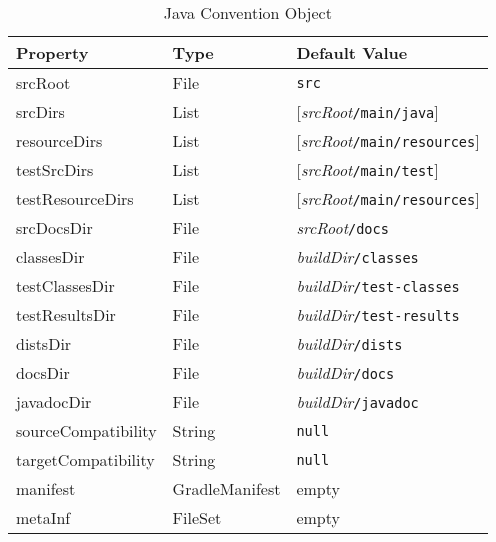 \begin{table}[h]
	\begin{center}
		\begin{tabular}{|l|l|l|} \hline
			\textbf{Property} & \textbf{Type} & \textbf{Default Value} \\ \hline
			srcRoot & File & \texttt{src} \\ \hline
			srcDirs & List & [\emph{srcRoot}\texttt{/main/java}] \\ \hline
			resourceDirs & List & [\emph{srcRoot}\texttt{/main/resources}]\\ \hline
			testSrcDirs & List & [\emph{srcRoot}\texttt{/main/test}] \\ \hline
			testResourceDirs & List & [\emph{srcRoot}\texttt{/main/resources}] \\ \hline
			srcDocsDir & File & \emph{srcRoot}\texttt{/docs} \\ \hline
			classesDir & File & \emph{buildDir}\texttt{/classes} \\ \hline
			testClassesDir & File & \emph{buildDir}\texttt{/test-classes} \\ \hline
			testResultsDir & File & \emph{buildDir}\texttt{/test-results} \\ \hline
			distsDir & File & \emph{buildDir}\texttt{/dists} \\ \hline
			docsDir & File & \emph{buildDir}\texttt{/docs} \\ \hline
			javadocDir & File & \emph{buildDir}\texttt{/javadoc} \\ \hline
			sourceCompatibility & String & \texttt{null} \\ \hline
			targetCompatibility & String & \texttt{null} \\ \hline
			manifest & GradleManifest & empty \\ \hline
			metaInf & FileSet & empty \\ \hline
		\end{tabular}
	\end{center}
	\caption{Java Convention Object}
	\label{javaconvention}
\end{table}


